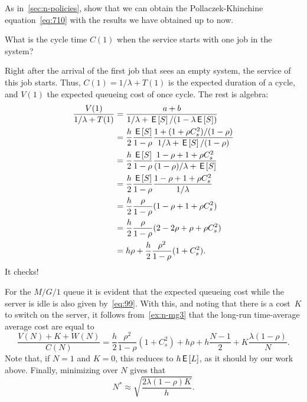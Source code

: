 \begin{exercise}
As in~\cref{sec:n-policies}, show that we can obtain the Pollaczek-Khinchine equation~\cref{eq:710} with the results we have obtained up to now. 
\begin{hint}
  What is the cycle time $C(1)$ when the service starts with one job in the system? 
\end{hint}
\begin{solution}
  Right after the arrival of the first job that sees an empty system, the service of this job starts.
  Thus, $C(1) = 1/\lambda + T(1)$ is the expected duration of a cycle, and $V(1)$ the expected queueing cost of once cycle.
  The rest is algebra:
  \begin{align*}
    \frac{V(1)}{1/\lambda + T(1)}
    &= \frac{a + b}{1/\lambda + \,\mathsf{E}\left[S\right]/(1-\lambda \,\mathsf{E}\left[S\right])} \\
    &= \frac{h} 2 \frac{\,\mathsf{E}\left[S\right]}{1-\rho} \frac{1 + (1+\rho C_s^2 )/(1-\rho)}{1/\lambda + \,\mathsf{E}\left[S\right] /(1-\rho)} \\
    &= \frac{h} 2 \frac{\,\mathsf{E}\left[S\right]}{1-\rho} \frac{1-\rho + 1 +\rho C_s^2}{(1-\rho)/\lambda + \,\mathsf{E}\left[S\right]} \\
    &= \frac{h} 2 \frac{\,\mathsf{E}\left[S\right]}{1-\rho} \frac{1-\rho + 1 +\rho C_s^2}{1/\lambda } \\
    &= \frac{h} 2 \frac{\rho}{1-\rho} (1-\rho + 1 +\rho C_s^2) \\
    &= \frac{h} 2 \frac{\rho}{1-\rho} (2-2\rho + \rho +\rho C_s^2) \\
    &= h \rho + \frac h 2 \frac{\rho^2}{1-\rho} (1+ C_s^2).
  \end{align*}
It checks!  
\end{solution}
\end{exercise}

For the $M/G/1$ queue it is evident that the expected queueing cost while the server is idle is also given by~\cref{eq:99}.
With this, and noting that there is a cost~$K$ to switch on the server, it follows from~\cref{ex:n-mg3} that the long-run time-average average cost are equal to
\begin{equation}
  \label{eq:100}
    \frac{V(N) + K + W(N)}{C(N)}
    = \frac h 2 \frac{\rho^2}{1-\rho} (1+ C_s^2) + h \rho + h \frac{N-1}2 + K \frac{\lambda(1-\rho)}N.
\end{equation}
Note that, if $N=1$ and $K=0$, this reduces to $h \,\mathsf{E}\left[L\right]$, as it should by our work above.
Finally, minimizing over $N$ gives that
\begin{equation*}
  N^* \approx \sqrt{\frac{2\lambda(1-\rho)K}{h}}.
\end{equation*}

